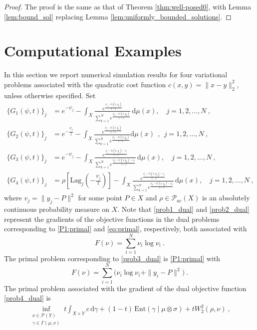 \documentclass{scrartcl}
\newcommand{\dd}{\mathrm d}
\theoremstyle{plain}
\theoremstyle{definition}
\begin{document}
\begin{proof}
    The proof is the same as that of Theorem \ref{thm:well-posed0}, with Lemma \ref{lem:bound_sol} replacing Lemma \ref{lem:uniformly_bounded_solutions}.
\end{proof}

\section{Computational Examples}\label{sec:examples}

In this section we report numerical simulation results for four variational problems associated with the quadratic cost function \(c(x,y)=\|x-y\|_2^2\), unless otherwise specified. Set
\begin{align}
    \{G_1(\psi, t)\}_j &= e^{-\psi_j} - \int_X \frac{e^{\frac{\psi_j - t c(x, y_j)}{1 - t}}}{\sum_{k=1}^N e^{\frac{\psi_k - t c(x, y_k)}{1 - t}}} \, \dd\mu(x), \quad j = 1, 2, \dots, N\ ,\label{prob1_dual}\\
    \{G_2(\psi,t)\}_j &= e^{-\frac{\psi_j}{t}} - \int_X\frac{e^{\frac{\psi_j - tc(x,y_j)}{1-t}}}{\sum_{k=1}^N e^{\frac{\psi_k - tc(x,y_k)}{1-t}}}\dd\mu(x)\ \ ,\ \ j=1,2,\dots, N\ ,\label{prob2_dual}\\
     \{G_3(\psi, t)\}_j &= e^{-\psi_j} - \int_X \frac{e^{\frac{\psi_j - t c(x, y_j) - v_j}{1 - t}}}{\sum_{k=1}^N e^{\frac{\psi_k - t c(x, y_k) - v_k}{1 - t}}} \, \dd\mu(x), \quad j = 1, 2, \dots, N\ ,\label{prob3_dual}\\
     \{G_4(\psi, t)\}_j &=  \rho[\mathrm{Lag}_j(-\tfrac{\psi_j}{t})] - \int_X \frac{e^{\frac{\psi_j - t c(x, y_j) - v_j}{1 - t}}}{\sum_{k=1}^N e^{\frac{\psi_k - t c(x, y_k) - v_k}{1 - t}}} \, \dd\mu(x), \quad j = 1, 2, \dots, N\ ,\label{prob4_dual}
\end{align}
where \(v_j = \|y_j - P\|^2\) for some point \(P\in X\) and $\rho\in\mathcal{P}_{ac}(X)$ is an absolutely continuous probability measure on $X$. Note that \eqref{prob1_dual} and \eqref{prob2_dual} represent the gradients of the objective functions in the dual problems corresponding to \eqref{P1:primal} and \eqref{eq:primal}, respectively, both associated with
\[
    F(\nu)=\sum_{i=1}^N \nu_i\log\nu_i\ .
\]
The primal problem corresponding to \eqref{prob3_dual} is \eqref{P1:primal} with
\[
    F(\nu)=\sum_{i=1}^N\bigl(\nu_i\log\nu_i+\|y_i-P\|^2\bigr)\ .
\]
The primal problem associated with the gradient of the dual objective function
\eqref{prob4_dual} is
\begin{gather}\label{P4_primal}
    \inf_{\substack{\nu\in\mathcal P(Y)\\\gamma\in\Gamma(\mu,\nu)}} t\int_{X\times Y} c\,\mathrm{d}\gamma +(1-t)\,\mathrm{Ent}(\gamma\mid\mu\otimes\sigma) +tW^2_2(\rho,\nu)\ ,
\end{gather}
\end{document}

